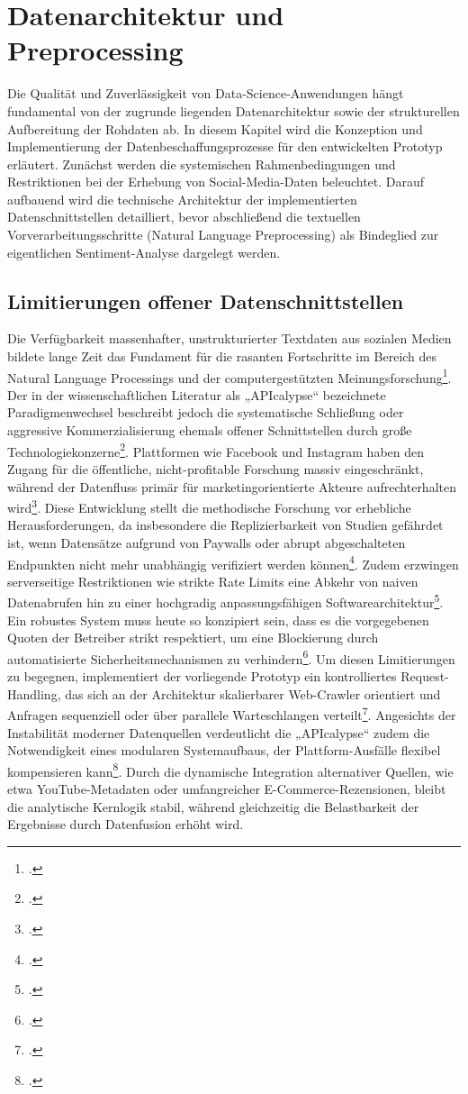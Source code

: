 \documentclass[12pt]{article}
\begin{document}
\section{Datenarchitektur und Preprocessing}
Die Qualität und Zuverlässigkeit von Data-Science-Anwendungen hängt fundamental von der zugrunde liegenden Datenarchitektur sowie der strukturellen Aufbereitung der Rohdaten ab. In diesem Kapitel wird die Konzeption und Implementierung der Datenbeschaffungsprozesse für den entwickelten Prototyp erläutert. Zunächst werden die systemischen Rahmenbedingungen und Restriktionen bei der Erhebung von Social-Media-Daten beleuchtet. Darauf aufbauend wird die technische Architektur der implementierten Datenschnittstellen detailliert, bevor abschließend die textuellen Vorverarbeitungsschritte (Natural Language Preprocessing) als Bindeglied zur eigentlichen Sentiment-Analyse dargelegt werden.
\subsection{Limitierungen offener Datenschnittstellen}
Die Verfügbarkeit massenhafter, unstrukturierter Textdaten aus sozialen Medien bildete lange Zeit das Fundament für die rasanten Fortschritte im Bereich des Natural Language Processings und der computergestützten Meinungsforschung\footcite[1]{bharathi-2025}. Der in der wissenschaftlichen Literatur als „APIcalypse“ bezeichnete Paradigmenwechsel beschreibt jedoch die systematische Schließung oder aggressive Kommerzialisierung ehemals offener Schnittstellen durch große Technologiekonzerne\footcite[3]{perriam-2020}. Plattformen wie Facebook und Instagram haben den Zugang für die öffentliche, nicht-profitable Forschung massiv eingeschränkt, während der Datenfluss primär für marketingorientierte Akteure aufrechterhalten wird\footcite[7]{perriam-2020}.
Diese Entwicklung stellt die methodische Forschung vor erhebliche Herausforderungen, da insbesondere die Replizierbarkeit von Studien gefährdet ist, wenn Datensätze aufgrund von Paywalls oder abrupt abgeschalteten Endpunkten nicht mehr unabhängig verifiziert werden können\footcite[7]{perriam-2020}. Zudem erzwingen serverseitige Restriktionen wie strikte Rate Limits eine Abkehr von naiven Datenabrufen hin zu einer hochgradig anpassungsfähigen Softwarearchitektur\footcite[373]{liu-2011}. Ein robustes System muss heute so konzipiert sein, dass es die vorgegebenen Quoten der Betreiber strikt respektiert, um eine Blockierung durch automatisierte Sicherheitsmechanismen zu verhindern\footcite[373]{liu-2011}.
Um diesen Limitierungen zu begegnen, implementiert der vorliegende Prototyp ein kontrolliertes Request-Handling, das sich an der Architektur skalierbarer Web-Crawler orientiert und Anfragen sequenziell oder über parallele Warteschlangen verteilt\footcite[343]{liu-2011}. Angesichts der Instabilität moderner Datenquellen verdeutlicht die „APIcalypse“ zudem die Notwendigkeit eines modularen Systemaufbaus, der Plattform-Ausfälle flexibel kompensieren kann\footcite[3]{perriam-2020}. Durch die dynamische Integration alternativer Quellen, wie etwa YouTube-Metadaten oder umfangreicher E-Commerce-Rezensionen, bleibt die analytische Kernlogik stabil, während gleichzeitig die Belastbarkeit der Ergebnisse durch Datenfusion erhöht wird.
\end{document}
